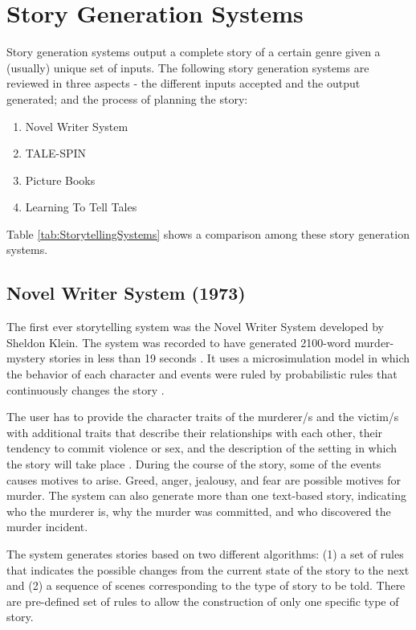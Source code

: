 \section{Story Generation Systems}
Story generation systems output a complete story of a certain genre given a (usually) unique set of inputs. The following story generation systems are reviewed in three aspects - the different inputs accepted and the output generated; and the process of planning the story:
\begin{enumerate}
\item Novel Writer System \cite{Gervas2012, Gervas2009, MendezGervasDeleon2014, LaclaustraLedesmaMendezGervas2014}
\item TALE-SPIN \cite{Gervas2009, Mawhorter2013, Meehan1977}
\item Picture Books \cite{SolisSiyTabiraoOng2009, angenhancing, picbooks4}
\item Learning To Tell Tales \cite{McIntyreLapata2009}
\end{enumerate}

Table \ref{tab:StorytellingSystems} shows a comparison among these story generation systems.

\subsection{Novel Writer System (1973)}
The first ever storytelling system was the Novel Writer System developed by Sheldon Klein. The system was recorded to have generated 2100-word murder-mystery stories in less than 19 seconds \cite{Gervas2012}. It uses a microsimulation model in which the behavior of each character and events were ruled by probabilistic rules that continuously changes the story \cite{Gervas2009}.

The user has to provide the character traits of the murderer/s and the victim/s with additional traits that describe their relationships with each other, their tendency to commit violence or sex, and the description of the setting in which the story will take place \cite{Gervas2012,  MendezGervasDeleon2014, LaclaustraLedesmaMendezGervas2014}. During the course of the story, some of the events causes motives to arise. Greed, anger, jealousy, and fear are possible motives for murder. The system can also generate more than one text-based story, indicating who the murderer is, why the murder was committed, and who discovered the murder incident.

The system generates stories based on two different algorithms: (1) a set of rules that indicates the possible changes from the current state of the story to the next and (2) a sequence of scenes corresponding to the type of story to be told. There are pre-defined set of rules to allow the construction of only one specific type of story.

